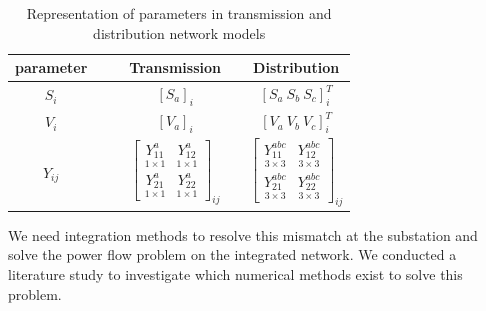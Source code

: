 \documentclass[10pt,journal]{article}
\begin{document}
\begin{table}[htbp]
\renewcommand{\arraystretch}{1.5}
\centering
\caption{Representation of parameters in transmission and distribution network models}\vspace{1.5ex}
\label{tab:substationbus}
\begin{tabular}{cccccc}
\toprule
parameter  &&& \multicolumn{1}{c}{Transmission} && \multicolumn{1}{c}{Distribution} \\ \hline
$S_i$ &&& $[S_a]_i$               && $\left[ S_a \ S_b \ S_c \right]_i^T$          \\
$V_i$  &&& $[V_a]_i$             && $\left[ V_a \ V_b \ V_c \right]_i^T$            \\
$Y_{ij}$ &&& $\begin{bmatrix}
              \underset{\scriptscriptstyle 1\times 1}{Y^{a}_{11}} &  \underset{\scriptscriptstyle 1\times 1}{Y^{a}_{12}} \\[1.5ex]
                \underset{\scriptscriptstyle 1\times 1}{Y^{a}_{21}} &  \underset{\scriptscriptstyle 1\times 1}{Y^{a}_{22}}
              \end{bmatrix}_{ij}$        && $\begin{bmatrix}
              \underset{\scriptscriptstyle 3\times 3}{Y^{abc}_{11}} &  \underset{\scriptscriptstyle 3\times 3}{Y^{abc}_{12}} \\[1.5ex]
                \underset{\scriptscriptstyle 3\times 3}{Y^{abc}_{21}} &  \underset{\scriptscriptstyle 3\times 3}{Y^{abc}_{22}}
              \end{bmatrix}_{ij}$          \\      
\toprule
\end{tabular}
\end{table}
We need integration methods to resolve this mismatch at the substation and solve the power flow problem on the integrated network. We conducted a literature study to investigate which numerical methods exist to solve this problem. \\ \\ 
\end{document}
